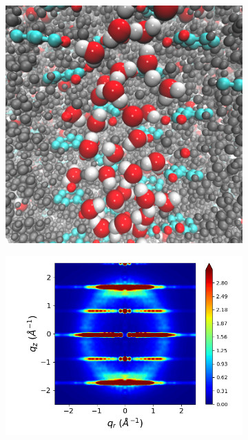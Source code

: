 \documentclass[journal=jpcbfk,manuscript=article]{achemso}
\begin{document}
\begin{figure}[!htb]
\begin{subfigure}{0.3\linewidth}
  	\label{fig:rotated_monomers}
  \end{subfigure}
  \begin{subfigure}{0.3\linewidth}
  	\centering
  	\includegraphics[width=\textwidth]{solvated_pore_cross_section.png}  %
  	\label{fig:solvated_pore}
  \end{subfigure}
  \begin{subfigure}{0.3\linewidth}
  	\centering
  	\includegraphics[width=\textwidth]{staggered_rzplot_restrained.png}

\end{subfigure}
\end{figure}
\end{document}
